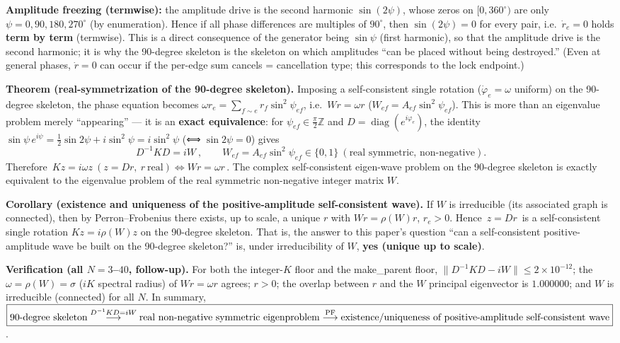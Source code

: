 \documentclass[
  a4paper,
]{ltjsarticle}
\begin{document}
\textbf{Amplitude freezing (termwise):} the amplitude drive is the
second harmonic \(\sin(2\psi)\), whose zeros on \([0,360^\circ)\) are
only \(\psi=0,90,180,270^\circ\) (by enumeration). Hence if all phase
differences are multiples of \(90^\circ\), then \(\sin(2\psi)=0\) for
every pair, i.e.~\(\dot r_e=0\) holds \textbf{term by term} (termwise).
This is a direct consequence of the generator being \(\sin\psi\) (first
harmonic), so that the amplitude drive is the second harmonic; it is why
the 90-degree skeleton is the skeleton on which amplitudes ``can be
placed without being destroyed.'' (Even at general phases, \(\dot r=0\)
can occur if the per-edge sum cancels = cancellation type; this
corresponds to the lock endpoint.)

\textbf{Theorem (real-symmetrization of the 90-degree skeleton).}
Imposing a self-consistent single rotation (\(\dot\varphi_e=\omega\)
uniform) on the 90-degree skeleton, the phase equation becomes
\(\omega r_e=\sum_{f\sim e}r_f\sin^2\psi_{ef}\), i.e.~\(Wr=\omega r\)
(\(W_{ef}=A_{ef}\sin^2\psi_{ef}\)). This is more than an eigenvalue
problem merely ``appearing'' --- it is an \textbf{exact equivalence}:
for \(\psi_{ef}\in\frac{\pi}{2}\mathbb Z\) and
\(D=\operatorname{diag}(e^{i\varphi_e})\), the identity
\(\sin\psi\,e^{i\psi}=\tfrac12\sin2\psi+i\sin^2\psi=i\sin^2\psi\) (⟺
\(\sin2\psi=0\)) gives
\[\boxed{\ D^{-1}KD=iW\ },\qquad W_{ef}=A_{ef}\sin^2\psi_{ef}\in\{0,1\}\ (\text{real symmetric, non-negative}).\]
Therefore
\(\boxed{\,Kz=i\omega z\ (z=Dr,\ r\ \text{real})\iff Wr=\omega r\,}\).
The complex self-consistent eigen-wave problem on the 90-degree skeleton
is exactly equivalent to the eigenvalue problem of the real symmetric
non-negative integer matrix \(W\).

\textbf{Corollary (existence and uniqueness of the positive-amplitude
self-consistent wave).} If \(W\) is irreducible (its associated graph is
connected), then by Perron--Frobenius there exists, up to scale, a
unique \(r\) with \(Wr=\rho(W)r\), \(r_e>0\). Hence \(\boxed{\,z=Dr\,}\)
is a self-consistent single rotation \(Kz=i\rho(W)z\) on the 90-degree
skeleton. That is, the answer to this paper's question ``can a
self-consistent positive-amplitude wave be built on the 90-degree
skeleton?'' is, under irreducibility of \(W\), \textbf{yes (unique up to
scale)}.

\textbf{Verification (all \(N=3\)--\(40\), follow-up).} For both the
integer-\(K\) floor and the make\_parent floor,
\(\|D^{-1}KD-iW\|\le2\times10^{-12}\); the \(\omega=\rho(W)=\sigma\)
(\(iK\) spectral radius) of \(Wr=\omega r\) agrees; \(r>0\); the overlap
between \(r\) and the \(W\) principal eigenvector is \(1.000000\); and
\(W\) is irreducible (connected) for all \(N\). In summary,
\(\boxed{\text{90-degree skeleton}\overset{D^{-1}KD=iW}{\longrightarrow}\text{real non-negative symmetric eigenproblem}\overset{\rm PF}{\longrightarrow}\text{existence/uniqueness of positive-amplitude self-consistent wave}}\).
\end{document}
